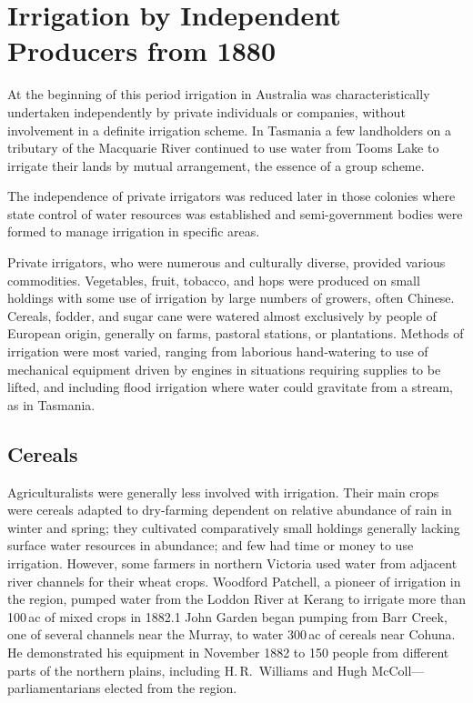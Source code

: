 
\setcounter{endnote}{0}
 
\chapter{Irrigation by Independent Producers from 1880}

At the beginning of this period irrigation in Australia was
characteristically undertaken independently by private individuals or
companies, without involvement in a definite irrigation scheme.  In
Tasmania a few landholders on a tributary of the Macquarie River
continued to use water from Tooms Lake to irrigate their lands by
mutual arrangement, the essence of a group scheme.

The independence of private irrigators was reduced later in those
colonies where state control of water resources was established and
semi-government bodies were formed to manage irrigation in specific
areas.

Private irrigators, who were numerous and culturally diverse, provided
various commodities.  Vegetables, fruit, tobacco, and hops were
produced on small holdings with some use of irrigation by large
numbers of growers, often Chinese.  Cereals, fodder, and sugar cane
were watered almost exclusively by people of European origin,
generally on farms, pastoral stations, or plantations.  Methods of
irrigation were most varied, ranging from laborious hand-watering to
use of mechanical equipment driven by engines in situations requiring
supplies to be lifted, and including flood irrigation where water
could gravitate from a stream, as in Tasmania.

\section*{Cereals}

Agriculturalists were generally less involved with irrigation. Their
main crops were cereals adapted to dry-farming dependent on relative
abundance of rain in winter and spring; they cultivated comparatively
small holdings generally lacking surface water resources in abundance;
and few had time or money to use irrigation.  However, some farmers in
northern Victoria used water from adjacent river channels for their
wheat crops.  Woodford Patchell, a pioneer of irrigation in the
region, pumped water from the Loddon River at Kerang to irrigate more
than 100\,ac of mixed crops in 1882.1  John Garden began pumping from Barr Creek, one of
several channels near the Murray, to water 300\,ac of cereals near
Cohuna.  He demonstrated his equipment in November 1882 to 150 people
from different parts of the northern plains, including H.\,R.~Williams
and Hugh McColl---parliamentarians elected from the
region.

